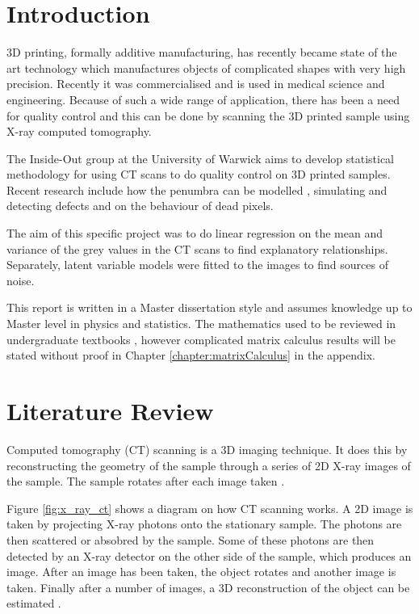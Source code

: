 \documentclass[12pt]{report}
\begin{document}
\tableofcontents

\chapter{Introduction}

3D printing, formally additive manufacturing, has recently became state of the art technology which manufactures objects of complicated shapes with very high precision. Recently it was commercialised and is used in medical science and engineering. Because of such a wide range of application, there has been a need for quality control and this can be done by scanning the 3D printed sample using X-ray computed tomography.

The Inside-Out group at the University of Warwick aims to develop statistical methodology for using CT scans to do quality control on 3D printed samples. Recent research include how the penumbra can be modelled \cite{kueh2014modelling}, simulating and detecting defects and on the behaviour of dead pixels.

The aim of this specific project was to do linear regression on the mean and variance of the grey values in the CT scans to find explanatory relationships. Separately, latent variable models were fitted to the images to find sources of noise.

This report is written in a Master dissertation style and assumes knowledge up to Master level in physics and statistics. The mathematics used to be reviewed in undergraduate textbooks \cite{riley2006mathematical}, however complicated matrix calculus results will be stated without proof in Chapter \ref{chapter:matrixCalculus} in the appendix.

\chapter{Literature Review}
Computed tomography (CT) scanning is a 3D imaging technique. It does this by reconstructing the geometry of the sample through a series of 2D X-ray images of the sample. The sample rotates after each image taken \cite{cantatore2011introduction}.

Figure \ref{fig:x_ray_ct} shows a diagram on how CT scanning works. A 2D image is taken by projecting X-ray photons onto the stationary sample. The photons are then scattered or absobred by the sample.  Some of these photons are then detected by an X-ray detector on the other side of the sample, which produces an image. After an image has been taken, the object rotates and another image is taken. Finally after a number of images, a 3D reconstruction of the object can be estimated \cite{cantatore2011introduction}.
\end{document}
